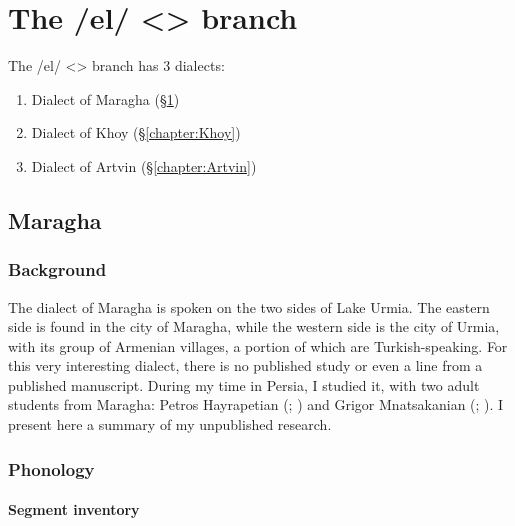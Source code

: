 \part{The /el/ <> branch}

The /el/ <> branch has 3 dialects:

\begin{enumerate}
	\item Dialect of Maragha (\S\ref{chapter:Maragha})
	\item Dialect of Khoy (\S\ref{chapter:Khoy})
	\item Dialect of Artvin (\S\ref{chapter:Artvin})
	
	
\end{enumerate}


\chapter{Maragha}\label{chapter:Maragha}
\section{Background}

\begin{adjarianpage}\label{page:281}\end{adjarianpage}%

The dialect of Maragha is spoken on the two sides of Lake Urmia. The eastern side is found in the city of Maragha, while the western side is the city of Urmia, with its group of Armenian villages, a portion of which are Turkish-speaking. For this very interesting dialect, there is no published study or even a line from a published manuscript. During my time in Persia, I studied it, with two adult students from Maragha: Petros Hayrapetian (; ) and Grigor Mnatsakanian (; ). I present here a summary of my unpublished research. 


\section{Phonology}
\subsection{Segment inventory}

